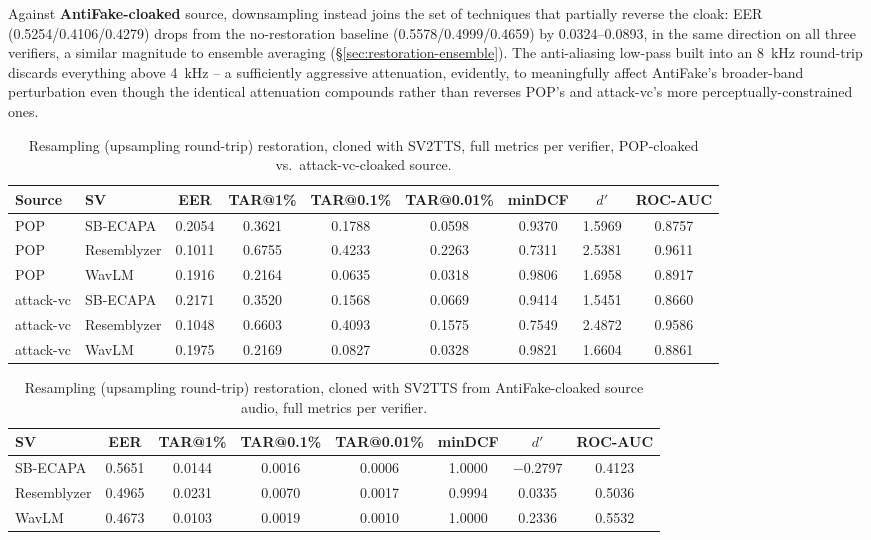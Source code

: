 \documentclass[11pt]{article}
\begin{document}
Against \textbf{AntiFake-cloaked} source, downsampling instead joins
the set of techniques that partially reverse the cloak: EER
(0.5254/0.4106/0.4279) drops from the no-restoration baseline
(0.5578/0.4999/0.4659) by 0.0324--0.0893, in the same direction on all
three verifiers, a similar magnitude to ensemble averaging
(\S\ref{sec:restoration-ensemble}). The anti-aliasing low-pass built
into an 8~kHz round-trip discards everything above 4~kHz -- a
sufficiently aggressive attenuation, evidently, to meaningfully affect
AntiFake's broader-band perturbation even though the identical
attenuation compounds rather than reverses POP's and attack-vc's more
perceptually-constrained ones.

\begin{table}[H]
\centering
\caption{Resampling (upsampling round-trip) restoration, cloned with
SV2TTS, full metrics per verifier, POP-cloaked vs.\ attack-vc-cloaked
source.}
\label{tab:restoration-upsampling-results}
\begin{tabular}{llccccccc}
\toprule
Source & SV & EER & TAR@1\% & TAR@0.1\% & TAR@0.01\% & minDCF & $d'$ & ROC-AUC \\
\midrule
POP        & SB-ECAPA    & 0.2054 & 0.3621 & 0.1788 & 0.0598 & 0.9370 & 1.5969 & 0.8757 \\
POP        & Resemblyzer & 0.1011 & 0.6755 & 0.4233 & 0.2263 & 0.7311 & 2.5381 & 0.9611 \\
POP        & WavLM       & 0.1916 & 0.2164 & 0.0635 & 0.0318 & 0.9806 & 1.6958 & 0.8917 \\
\addlinespace
attack-vc  & SB-ECAPA    & 0.2171 & 0.3520 & 0.1568 & 0.0669 & 0.9414 & 1.5451 & 0.8660 \\
attack-vc  & Resemblyzer & 0.1048 & 0.6603 & 0.4093 & 0.1575 & 0.7549 & 2.4872 & 0.9586 \\
attack-vc  & WavLM       & 0.1975 & 0.2169 & 0.0827 & 0.0328 & 0.9821 & 1.6604 & 0.8861 \\
\bottomrule
\end{tabular}
\end{table}

\begin{table}[H]
\centering
\caption{Resampling (upsampling round-trip) restoration, cloned with
SV2TTS from AntiFake-cloaked source audio, full metrics per verifier.}
\label{tab:restoration-upsampling-antifake-results}
\begin{tabular}{lccccccc}
\toprule
SV & EER & TAR@1\% & TAR@0.1\% & TAR@0.01\% & minDCF & $d'$ & ROC-AUC \\
\midrule
SB-ECAPA    & 0.5651 & 0.0144 & 0.0016 & 0.0006 & 1.0000 & $-$0.2797 & 0.4123 \\
Resemblyzer & 0.4965 & 0.0231 & 0.0070 & 0.0017 & 0.9994 & 0.0335 & 0.5036 \\
WavLM       & 0.4673 & 0.0103 & 0.0019 & 0.0010 & 1.0000 & 0.2336 & 0.5532 \\
\bottomrule
\end{tabular}
\end{table}
\end{document}
